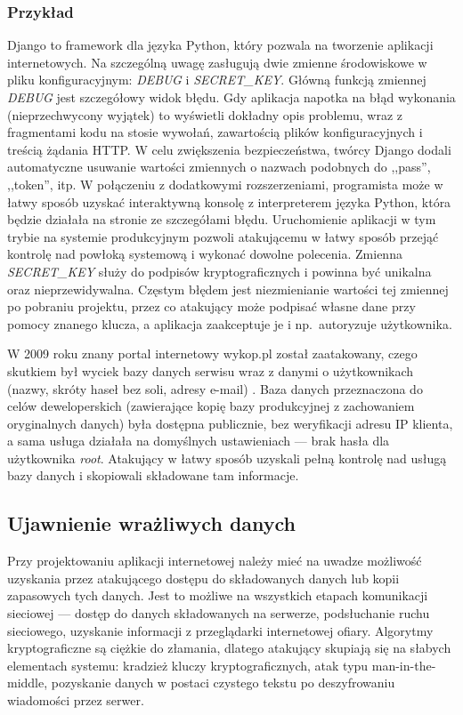 \documentclass[11pt,a4paper,polish,thesis,oneside]{dcsbook}
\begin{document}
\subsubsection*{Przykład}
Django \cite{django} to framework dla języka Python, który pozwala na tworzenie aplikacji internetowych. Na szczególną uwagę zasługują dwie zmienne środowiskowe w pliku konfiguracyjnym: \textit{DEBUG} i \textit{SECRET\_KEY}. Główną funkcją zmiennej \textit{DEBUG} jest szczegółowy widok błędu. Gdy aplikacja napotka na błąd wykonania (nieprzechwycony wyjątek) to wyświetli dokładny opis problemu, wraz z fragmentami kodu na stosie wywołań, zawartością plików konfiguracyjnych i treścią żądania HTTP. W celu zwiększenia bezpieczeństwa, twórcy Django dodali automatyczne usuwanie wartości zmiennych o nazwach podobnych do ,,pass'', ,,token'', itp. W połączeniu z dodatkowymi rozszerzeniami, programista może w łatwy sposób uzyskać interaktywną konsolę z interpreterem języka Python, która będzie działała na stronie ze szczegółami błędu. Uruchomienie aplikacji w tym trybie na systemie produkcyjnym pozwoli atakującemu w łatwy sposób przejąć kontrolę nad powłoką systemową i wykonać dowolne polecenia. Zmienna \textit{SECRET\_KEY} służy do podpisów kryptograficznych i powinna być unikalna oraz nieprzewidywalna. Częstym błędem jest niezmienianie wartości tej zmiennej po pobraniu projektu, przez co atakujący może podpisać własne dane przy pomocy znanego klucza, a aplikacja zaakceptuje je i np.~autoryzuje użytkownika.

W 2009 roku znany portal internetowy wykop.pl został zaatakowany, czego skutkiem był wyciek bazy danych serwisu wraz z danymi o użytkownikach (nazwy, skróty haseł bez soli, adresy e-mail) \cite{wykop}. Baza danych przeznaczona do celów deweloperskich (zawierające kopię bazy produkcyjnej z zachowaniem oryginalnych danych) była dostępna publicznie, bez weryfikacji adresu IP klienta, a sama usługa działała na domyślnych ustawieniach --- brak hasła dla użytkownika \textit{root}. Atakujący w łatwy sposób uzyskali pełną kontrolę nad usługą bazy danych i skopiowali składowane tam informacje.

\subsection{Ujawnienie wrażliwych danych}
Przy projektowaniu aplikacji internetowej należy mieć na uwadze możliwość uzyskania przez atakującego dostępu do składowanych danych lub kopii zapasowych tych danych. Jest to możliwe na wszystkich etapach komunikacji sieciowej --- dostęp do danych składowanych na serwerze, podsłuchanie ruchu sieciowego, uzyskanie informacji z przeglądarki internetowej ofiary. Algorytmy kryptograficzne są ciężkie do złamania, dlatego atakujący skupiają się na słabych elementach systemu: kradzież kluczy kryptograficznych, atak typu man-in-the-middle, pozyskanie danych w postaci czystego tekstu po deszyfrowaniu wiadomości przez serwer.
\end{document}
